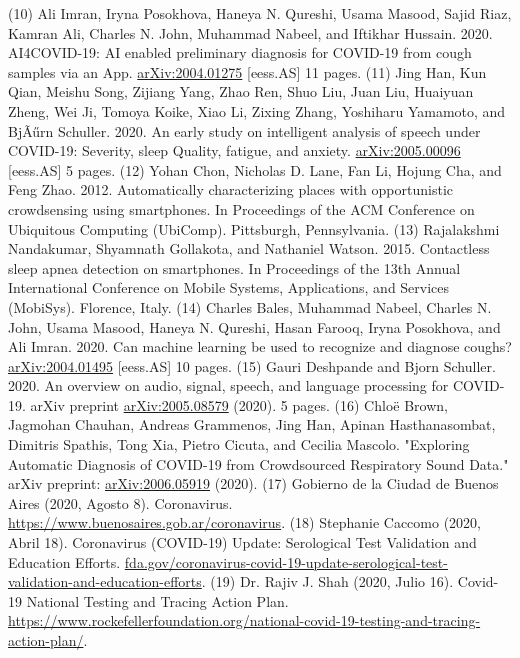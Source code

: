 \documentclass{nle}
\begin{document}
\begin{thebibliography}{}
   (10) Ali Imran, Iryna Posokhova, Haneya N. Qureshi, Usama Masood, Sajid Riaz, Kamran Ali, Charles N. John, Muhammad Nabeel, and Iftikhar Hussain. 2020. AI4COVID-19: AI enabled preliminary diagnosis for COVID-19 from cough samples via an App. \url{arXiv:2004.01275} [eess.AS] 11 pages.
   (11) Jing Han, Kun Qian, Meishu Song, Zijiang Yang, Zhao Ren, Shuo Liu, Juan Liu, Huaiyuan Zheng, Wei Ji, Tomoya Koike, Xiao Li, Zixing Zhang, Yoshiharu Yamamoto, and BjÃűrn Schuller. 2020. An early study on intelligent analysis of speech under COVID-19: Severity, sleep Quality, fatigue, and anxiety. \url{arXiv:2005.00096} [eess.AS] 5 pages.
   (12) Yohan Chon, Nicholas D. Lane, Fan Li, Hojung Cha, and Feng Zhao. 2012. Automatically characterizing places with opportunistic crowdsensing using smartphones. In Proceedings of the ACM Conference on Ubiquitous Computing (UbiComp). Pittsburgh, Pennsylvania.
   (13) Rajalakshmi Nandakumar, Shyamnath Gollakota, and Nathaniel Watson. 2015. Contactless sleep apnea detection on smartphones. In Proceedings of the 13th Annual International Conference on Mobile Systems, Applications, and Services (MobiSys). Florence, Italy.
   (14) Charles Bales, Muhammad Nabeel, Charles N. John, Usama Masood, Haneya N. Qureshi, Hasan Farooq, Iryna Posokhova, and Ali Imran. 2020. Can machine learning be used to recognize and diagnose coughs? \url{arXiv:2004.01495} [eess.AS] 10 pages.
   (15) Gauri Deshpande and Bjorn Schuller. 2020. An overview on audio, signal, speech, and language processing for COVID-19. arXiv preprint \url{arXiv:2005.08579} (2020). 5 pages.
   (16) Chloë Brown, Jagmohan Chauhan, Andreas Grammenos, Jing Han, Apinan Hasthanasombat, Dimitris Spathis, Tong Xia, Pietro Cicuta, and Cecilia Mascolo. "Exploring Automatic Diagnosis of COVID-19 from Crowdsourced Respiratory Sound Data." arXiv preprint: \url{arXiv:2006.05919} (2020).
   (17) Gobierno de la Ciudad de Buenos Aires (2020, Agosto 8). Coronavirus. \url{https://www.buenosaires.gob.ar/coronavirus}.
   (18) Stephanie Caccomo (2020, Abril 18). Coronavirus (COVID-19) Update: Serological Test Validation and Education Efforts. \url{fda.gov/coronavirus-covid-19-update-serological-test-validation-and-education-efforts}.
   (19) Dr. Rajiv J. Shah (2020, Julio 16). Covid-19 National Testing and Tracing Action Plan. \url{https://www.rockefellerfoundation.org/national-covid-19-testing-and-tracing-action-plan/}.

\end{thebibliography}
\end{document}
